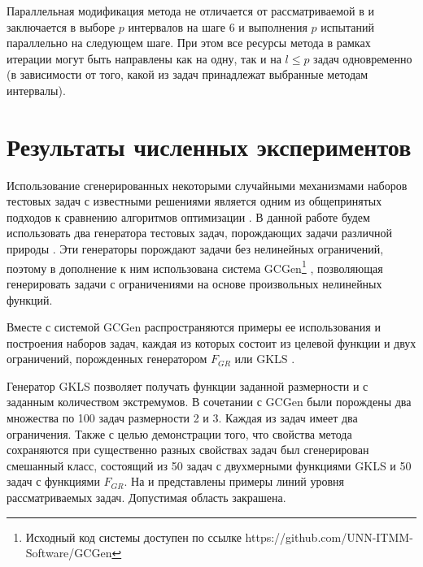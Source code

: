 \documentclass{cmi}
\begin{document}
Параллельная модификация метода не отличается от рассматриваемой в \cite{BarkalovStrongin2018}
и заключается в выборе \(p\) интервалов на шаге 6 и выполнения \(p\) испытаний параллельно
на следующем шаге. При этом все ресурсы метода в рамках итерации могут быть направлены как на одну, так и
на \(l\leqslant p\) задач одновременно (в зависимости от того, какой из задач принадлежат выбранные методам интервалы).

\section{Результаты численных экспериментов}

Использование сгенерированных некоторыми случайными механизмами
наборов тестовых задач с известными решениями является одним из общепринятых подходов
к сравнению алгоритмов оптимизации \cite{Beiranvand2017}. В данной работе
будем использовать два генератора тестовых задач, порождающих задачи различной природы \cite{grishaginClass, Gaviano2003}.
Эти генераторы порождают задачи без нелинейных ограничений, поэтому в дополнение к ним использована
система GCGen\footnote{Исходный код системы доступен по ссылке https://github.com/UNN-ITMM-Software/GCGen} \cite{GergelBarkalov2019}, позволяющая генерировать задачи с ограничениями на основе произвольных нелинейных
функций.

Вместе с системой GCGen распространяются примеры ее использования и построения
наборов задач, каждая из которых состоит из целевой функции и двух ограничений,
порожденных генератором \(F_{GR}\) \cite{grishaginClass} или GKLS \cite{Gaviano2003}.


Генератор GKLS \cite{Gaviano2003} позволяет получать функции заданной размерности и с заданным количеством экстремумов.
В сочетании с GCGen были порождены два множества по 100 задач размерности 2 и 3. Каждая из задач имеет два ограничения.
Также с целью демонстрации того, что свойства метода сохраняются при существенно разных свойствах задач
был сгенерирован смешанный класс, состоящий из 50 задач с двухмерными функциями GKLS и 50 задач с функциями \(F_{GR}\).
На  и  представлены примеры линий уровня рассматриваемых задач. Допустимая область закрашена.
\end{document}
